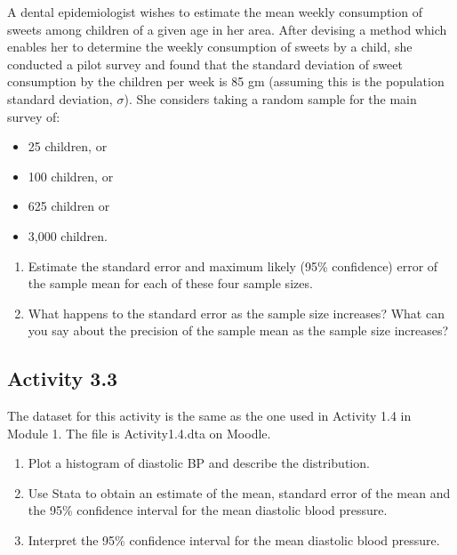 \documentclass[
]{memoir}
\providecommand{\tightlist}{%
  \setlength{\itemsep}{0pt}\setlength{\parskip}{0pt}}
\begin{document}
A dental epidemiologist wishes to estimate the mean weekly consumption of sweets among children of a given age in her area. After devising a method which enables her to determine the weekly consumption of sweets by a child, she conducted a pilot survey and found that the standard deviation of sweet consumption by the children per week is 85 gm (assuming this is the population standard deviation, \(\sigma\)). She considers taking a random sample for the main survey of:

\begin{itemize}
\tightlist
\item
  25 children, or
\item
  100 children, or
\item
  625 children or
\item
  3,000 children.
\end{itemize}

\begin{enumerate}
\def\labelenumi{\alph{enumi})}
\tightlist
\item
  Estimate the standard error and maximum likely (95\% confidence) error of the sample mean for each of these four sample sizes.
\item
  What happens to the standard error as the sample size increases? What can you say about the precision of the sample mean as the sample size increases?
\end{enumerate}

\hypertarget{activity-3.3}{%
\subsection*{Activity 3.3}\label{activity-3.3}}

The dataset for this activity is the same as the one used in Activity 1.4 in Module 1. The file is Activity1.4.dta on Moodle.

\begin{enumerate}
\def\labelenumi{\alph{enumi})}
\tightlist
\item
  Plot a histogram of diastolic BP and describe the distribution.
\item
  Use Stata to obtain an estimate of the mean, standard error of the mean and the 95\% confidence interval for the mean diastolic blood pressure.
\item
  Interpret the 95\% confidence interval for the mean diastolic blood pressure.
\end{enumerate}
\end{document}
